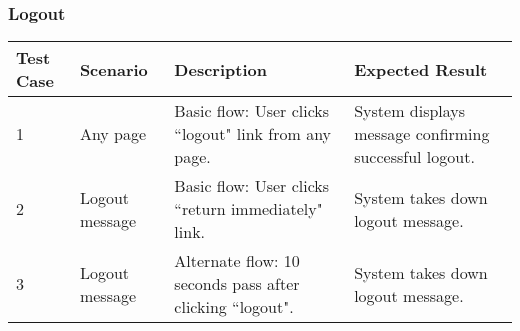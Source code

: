 \begin{landscape}
\subsubsection{Logout}
\begin{table}[!h]
    \begin{tabular}{|l|p{1in}|p{2.25in}|p{2.25in}|}
        \hline
        Test Case & Scenario & Description & Expected Result \\ \hline
        1 & Any page & Basic flow: User clicks ``logout" link from any page. & System displays message confirming successful logout. \\ \hline
        2 & Logout message & Basic flow: User clicks ``return immediately" link. & System takes down logout message. \\ \hline
        3 & Logout message & Alternate flow: 10 seconds pass after clicking ``logout". & System takes down logout message. \\ \hline
    \end{tabular}
\end{table}


\end{landscape}
